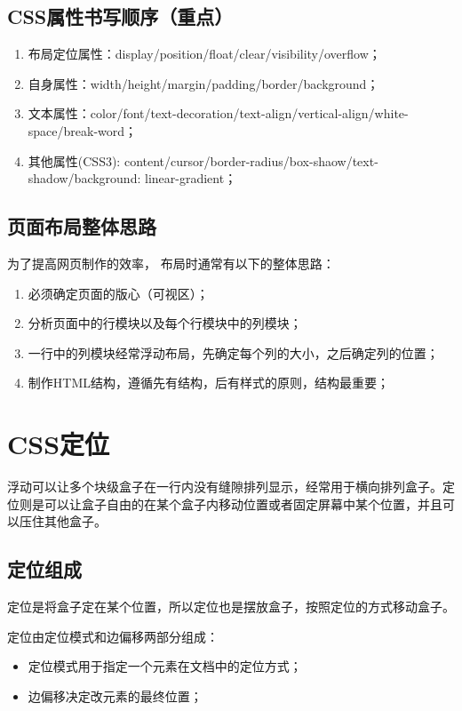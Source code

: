 \section{CSS属性书写顺序（重点）}
\begin{enumerate}
	\item 布局定位属性：display/position/float/clear/visibility/overflow；
	\item 自身属性：width/height/margin/padding/border/background；
	\item 文本属性：color/font/text-decoration/text-align/vertical-align/white-space/break-word；
	\item 其他属性(CSS3): content/cursor/border-radius/box-shaow/text-shadow/background: linear-gradient；
\end{enumerate}
\section{页面布局整体思路}
为了提高网页制作的效率， 布局时通常有以下的整体思路：
\begin{enumerate}
	\item 必须确定页面的版心（可视区）；
	\item 分析页面中的行模块以及每个行模块中的列模块；
	\item 一行中的列模块经常浮动布局，先确定每个列的大小，之后确定列的位置；
	\item 制作HTML结构，遵循先有结构，后有样式的原则，结构最重要；
\end{enumerate}

\chapter{CSS定位}
浮动可以让多个块级盒子在一行内没有缝隙排列显示，经常用于横向排列盒子。定位则是可以让盒子自由的在某个盒子内移动位置或者固定屏幕中某个位置，并且可以压住其他盒子。
\section{定位组成}
定位是将盒子定在某个位置，所以定位也是摆放盒子，按照定位的方式移动盒子。

定位由定位模式和边偏移两部分组成：
\begin{itemize}
	\item 定位模式用于指定一个元素在文档中的定位方式；
	\item 边偏移决定改元素的最终位置；
\end{itemize}
